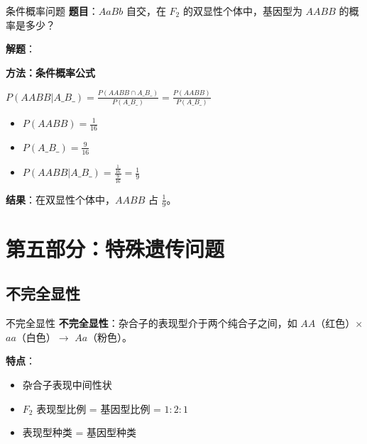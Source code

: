 \documentclass[a4paper,11pt]{ctexart}
\begin{document}
\begin{examplebox}{条件概率问题}
\textbf{题目}：$AaBb$ 自交，在 $F_2$ 的双显性个体中，基因型为 $AABB$ 的概率是多少？

\textbf{解题}：

\textbf{方法：条件概率公式}

$P(AABB | A\_B\_) = \frac{P(AABB \cap A\_B\_)}{P(A\_B\_)} = \frac{P(AABB)}{P(A\_B\_)}$

\begin{itemize}[leftmargin=2em]
    \item $P(AABB) = \frac{1}{16}$
    \item $P(A\_B\_) = \frac{9}{16}$
    \item $P(AABB | A\_B\_) = \frac{\frac{1}{16}}{\frac{9}{16}} = \frac{1}{9}$
\end{itemize}

\textbf{结果}：在双显性个体中，$AABB$ 占 $\frac{1}{9}$。
\end{examplebox}


\section{第五部分：特殊遗传问题}

\subsection{不完全显性}

\begin{definitionbox}{不完全显性}
\textbf{不完全显性}：杂合子的表现型介于两个纯合子之间，如 $AA$（红色）$\times$ $aa$（白色）$\to$ $Aa$（粉色）。

\textbf{特点}：
\begin{itemize}[leftmargin=2em]
    \item 杂合子表现中间性状
    \item $F_2$ 表现型比例 = 基因型比例 = $1:2:1$
    \item 表现型种类 = 基因型种类
\end{itemize}
\end{definitionbox}
\end{document}
